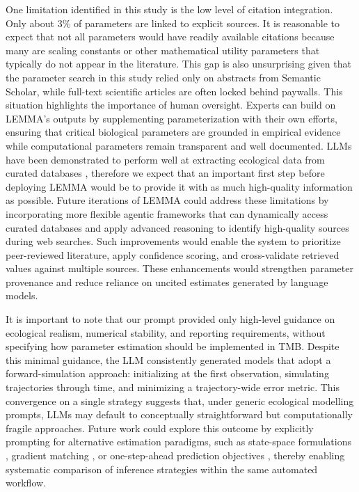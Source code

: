 One limitation identified in this study is the low level of citation integration. Only about 3\% of parameters are linked to explicit sources. It is reasonable to expect that not all parameters would have readily available citations because many are scaling constants or other mathematical utility parameters that typically do not appear in the literature. This gap is also unsurprising given that the parameter search in this study relied only on abstracts from Semantic Scholar, while full-text scientific articles are often locked behind paywalls.
This situation highlights the importance of human oversight. Experts can build on LEMMA's outputs by supplementing parameterization with their own efforts, ensuring that critical biological parameters are grounded in empirical evidence while computational parameters remain transparent and well documented.
LLMs have been demonstrated to perform well at extracting ecological data from curated databases \citep{gougherty2024testing,keck2025extracting}, therefore we expect that an important first step before deploying LEMMA would be to provide it with as much high-quality information as possible. Future iterations of LEMMA could address these limitations by incorporating more flexible agentic frameworks that can dynamically access curated databases and apply advanced reasoning to identify high-quality sources during web searches. Such improvements would enable the system to prioritize peer-reviewed literature, apply confidence scoring, and cross-validate retrieved values against multiple sources. These enhancements would strengthen parameter provenance and reduce reliance on uncited estimates generated by language models.

It is important to note that our prompt provided only high-level guidance on ecological realism, numerical stability, and reporting requirements, without specifying how parameter estimation should be implemented in TMB. Despite this minimal guidance, the LLM consistently generated models that adopt a forward-simulation approach: initializing at the first observation, simulating trajectories through time, and minimizing a trajectory-wide error metric. This convergence on a single strategy suggests that, under generic ecological modelling prompts, LLMs may default to conceptually straightforward but computationally fragile approaches. Future work could explore this outcome by explicitly prompting for alternative estimation paradigms, such as state-space formulations \citep{auger2021guide}, gradient matching \citep{ellner2002fitting}, or one-step-ahead prediction objectives \citep{munch2023recent}, thereby enabling systematic comparison of inference strategies within the same automated workflow.

